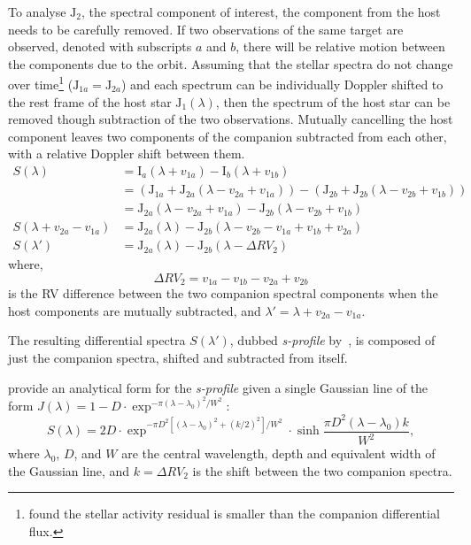 To analyse \(\textrm{J}_2\), the spectral component of interest, the component from the host needs to be carefully removed.
If two observations of the same target are observed, denoted with subscripts \(a\) and \(b\), there will be relative motion between the components due to the orbit.
Assuming that the stellar spectra do not change over time\footnote{\citet{kostogryz_spectral_2013} found the stellar activity residual is smaller than the companion differential flux.} (\(\textrm{J}_{1a} = \textrm{J}_{2a}\)) and each spectrum can be individually Doppler shifted to the rest frame of the host star \(\textrm{J}_{1}(\lambda)\), then the spectrum of the host star can be removed though subtraction of the two observations.
Mutually cancelling the host component leaves two components of the companion subtracted from each other, with a relative Doppler shift between them.
\begin{align}
S(\lambda) &= \textrm{I}_{a}(\lambda + v_{1a}) - \textrm{I}_{b}(\lambda + v_{1b}) \nonumber \\
&= (\textrm{J}_{1a} + \textrm{J}_{2a}(\lambda - v_{2a} + v_{1a})) - (\textrm{J}_{2b} +\textrm{J}_{2b}(\lambda - v_{2b} + v_{1b})) \nonumber \\
&= \textrm{J}_{2a}(\lambda - v_{2a} + v_{1a}) - \textrm{J}_{2b}(\lambda - v_{2b} + v_{1b}) \nonumber \\
S(\lambda + v_{2a}-v_{1a}) &= \textrm{J}_{2a}(\lambda) - \textrm{J}_{2b}(\lambda - v_{2b} - v_{1a} + v_{1b} + v_{2a})\\
S(\lambda') &= \textrm{J}_{2a}(\lambda) - \textrm{J}_{2b}(\lambda - \Delta {RV}_2) \label{eqn:sprofile}
\end{align}
where,
\begin{equation}
\Delta {RV}_2 = v_{1a} - v_{1b} - v_{2a} + v_{2b} \label{eqn:companion_difference}
\end{equation}
is the {RV} difference between the two companion spectral components when the host components are mutually subtracted,
and \(\lambda' = \lambda + v_{2a}-v_{1a}\).

The resulting differential spectra \(S({\lambda'})\), dubbed \emph{s-profile} by~\citet{ferluga_separating_1997}, is composed of just the companion spectra, shifted and subtracted from itself.

\citet{ferluga_separating_1997} provide an analytical form for the \emph{s-profile} given a single Gaussian line of the form
$J(\lambda) = 1- D \cdot\exp^{{-\pi {(\lambda - \lambda_0)}^2} / {{W}^{2}}}$:
\begin{equation}
S(\lambda) = 2 D\cdot\exp^{{-\pi {D}^{2} [{(\lambda - \lambda_0)}^{2} +{(k/2)}^{2}]}/{{W}^{2}}} \cdot \sinh{\frac{\pi {D}^{2}(\lambda-\lambda_0)k}{{W}^{2}}},\label{eqn:sprofile_gaussain}
\end{equation}
where $\lambda_0$, \(D\), and \(W\) are the central wavelength, depth and equivalent width of the Gaussian line, and $k=\Delta {RV}_2 $ is the shift between the two companion spectra.

